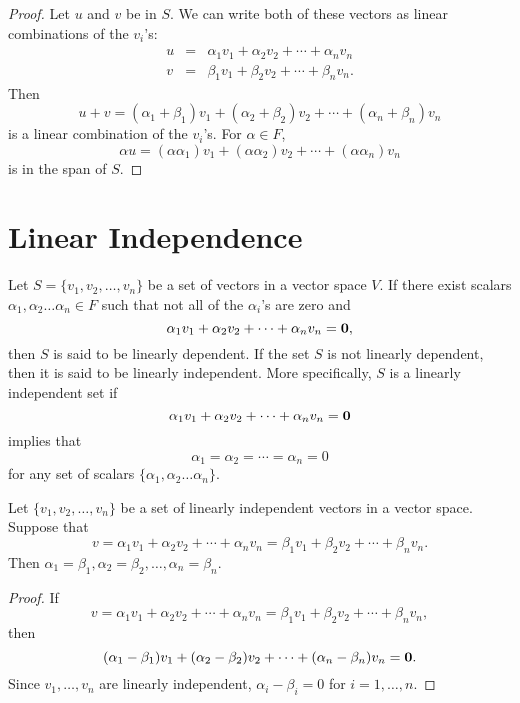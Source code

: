 \begin{proof}
Let $u$ and $v$ be in $S$. We can write both of these vectors as 
linear combinations of the $v_i$'s:
\begin{eqnarray*}
u & = & \alpha_1 v_1 + \alpha_2 v_2 + \cdots + \alpha_n v_n \\
v & = & \beta_1 v_1 + \beta_2 v_2 + \cdots + \beta_n v_n.
\end{eqnarray*}
Then
\[
u+ v =( \alpha_1 + \beta_1) v_1 + (\alpha_2+ \beta_2) v_2 + \cdots +
(\alpha_n + \beta_n) v_n 
\]
is a linear combination of the $v_i$'s. For $\alpha \in F$,
\[
\alpha u = (\alpha \alpha_1) v_1 + ( \alpha \alpha_2) v_2 + \cdots +
(\alpha \alpha_n ) v_n 
\]
is in the span of $S$.
\end{proof}


 
\section{Linear Independence}
 

Let $S = \{v_1, v_2, \ldots, v_n\}$ be a set of vectors in a vector
space $V$. If there exist scalars $\alpha_1, \alpha_2 \ldots \alpha_n
\in F$ such that not all of the $\alpha_i$'s are zero and 
\[
\alpha_1 v_1 + \alpha_2 v_2 + \cdots + \alpha_n v_n = {\bold 0 },
\]
then $S$ is said to be {\bfi linearly
dependent}. If the set $S$ is not linearly
dependent, then it is said to be {\bfi linearly
independent}. More specifically, $S$ is a
linearly independent set if
\[ 
\alpha_1 v_1 + \alpha_2 v_2 + \cdots + \alpha_n v_n = {\bold 0 }
\]
implies that
\[
\alpha_1 = \alpha_2 = \cdots = \alpha_n = 0
\]
for any set of scalars $\{ \alpha_1, \alpha_2 \ldots \alpha_n \}$.


 
\begin{proposition}
Let $\{ v_1, v_2, \ldots, v_n \}$ be a set of linearly independent
vectors in a vector space. Suppose that 
\[
v = \alpha_1 v_1 + \alpha_2 v_2 + \cdots + \alpha_n v_n
= \beta_1 v_1 + \beta_2 v_2 + \cdots + \beta_n v_n.
\]
Then $\alpha_1 = \beta_1, \alpha_2 = \beta_2, \ldots, \alpha_n =
\beta_n$. 
\end{proposition}

\begin{proof}
If 
\[
v = \alpha_1 v_1 + \alpha_2 v_2 + \cdots + \alpha_n v_n
= \beta_1 v_1 + \beta_2 v_2 + \cdots + \beta_n v_n,
\]
then
\[
(\alpha_1 - \beta_1) v_1 + (\alpha_2 - \beta_2) v_2 + \cdots +
(\alpha_n - \beta_n) v_n = {\bold 0}.
\]
Since $v_1, \ldots, v_n$ are linearly independent, $\alpha_i - \beta_i
=0$ for $i = 1, \ldots, n$.
\end{proof}
 

